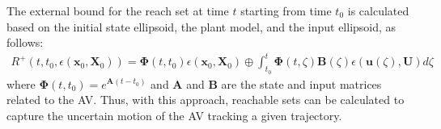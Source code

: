 The external bound for the reach set at time $ t $ starting from time $t_0 $ is calculated based on the initial state ellipsoid, the plant model, and the input ellipsoid, as follows: 
\vspace{-5pt}
\begin{align*}
R^{+}(t, t_0, \epsilon(\bm{x}_0, \bm{X}_0)) = \bm{\Phi}(t,t_0)\epsilon(\bm{x}_0,\bm{X}_0)
\oplus \int_{t_0}^{t} \bm{\Phi}(t, \zeta) \bm{B}(\zeta) \epsilon(\bm{u}(\zeta), \bm{U})d\zeta
\end{align*}
where $\bm{\Phi}(t,t_0) = e^{\bm{A}(t-t_0)}$ and $\bm{A}$ and $\bm{B}$ are the state and input matrices related to the AV.
Thus, with this approach, reachable sets can be calculated to capture the uncertain motion of the AV tracking a given trajectory. 

